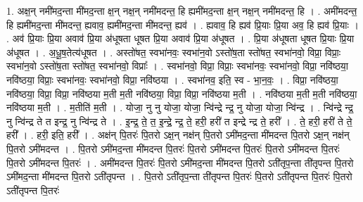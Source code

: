 \documentclass[17pt]{extarticle}
\begin{document}
1. अक्ष॒न् नमी॑मद॒न्ता मी॑मद॒न्ता क्ष॒न् नक्ष॒न् नमी॑मदन्त॒ हि ह्यमी॑मद॒न्ता क्ष॒न् नक्ष॒न् नमी॑मदन्त॒ हि । . अमी॑मदन्त॒ हि ह्यमी॑मद॒न्ता मी॑मदन्त॒ ह्यवाव॒ ह्यमी॑मद॒न्ता मी॑मदन्त॒ ह्यव॑ । . ह्यवाव॒ हि ह्यव॑ प्रि॒याः प्रि॒या अव॒ हि ह्यव॑ प्रि॒याः । . अव॑ प्रि॒याः प्रि॒या अवाव॑ प्रि॒या अ॑धूषता धूषत प्रि॒या अवाव॑ प्रि॒या अ॑धूषत । . प्रि॒या अ॑धूषता धूषत प्रि॒याः प्रि॒या अ॑धूषत । . अ॒धू॒ष॒तेत्य॑धूषत । . अस्तो॑षत॒ स्वभा॑नवः॒ स्वभा॑न॒वो ऽस्तो॑ष॒ता स्तो॑षत॒ स्वभा॑नवो॒ विप्रा॒ विप्राः॒ स्वभा॑न॒वो ऽस्तो॑ष॒ता स्तो॑षत॒ स्वभा॑नवो॒ विप्राः᳚ । . स्वभा॑नवो॒ विप्रा॒ विप्राः॒ स्वभा॑नवः॒ स्वभा॑नवो॒ विप्रा॒ नवि॑ष्ठया॒ नवि॑ष्ठया॒ विप्राः॒ स्वभा॑नवः॒ स्वभा॑नवो॒ विप्रा॒ नवि॑ष्ठया । . स्वभा॑नव॒ इति॒ स्व - भा॒न॒वः॒ । . विप्रा॒ नवि॑ष्ठया॒ नवि॑ष्ठया॒ विप्रा॒ विप्रा॒ नवि॑ष्ठया म॒ती म॒ती नवि॑ष्ठया॒ विप्रा॒ विप्रा॒ नवि॑ष्ठया म॒ती । . नवि॑ष्ठया म॒ती म॒ती नवि॑ष्ठया॒ नवि॑ष्ठया म॒ती । . म॒तीति॑ म॒ती । . योजा॒ नु नु योजा॒ योजा॒ न्वि॑न्द्रे न्द्र॒ नु योजा॒ योजा॒ न्वि॑न्द्र । . न्वि॑न्द्रे न्द्र॒ नु न्वि॑न्द्र ते त इन्द्र॒ नु न्वि॑न्द्र ते । . इ॒न्द्र॒ ते॒ त॒ इ॒न्द्रे॒ न्द्र॒ ते॒ हरी॒ हरी॑ त इन्द्रे न्द्र ते॒ हरी᳚ । . ते॒ हरी॒ हरी॑ ते ते॒ हरी᳚ । . हरी॒ इति॒ हरी᳚ । . अक्ष॑न् पि॒तरः॑ पि॒तरो ऽक्ष॒न् नक्ष॑न् पि॒तरो ऽमी॑मद॒न्ता मी॑मदन्त पि॒तरो ऽक्ष॒न् नक्ष॑न् पि॒तरो ऽमी॑मदन्त । . पि॒तरो ऽमी॑मद॒न्ता मी॑मदन्त पि॒तरः॑ पि॒तरो ऽमी॑मदन्त पि॒तरः॑ पि॒तरो ऽमी॑मदन्त पि॒तरः॑ पि॒तरो ऽमी॑मदन्त पि॒तरः॑ । . अमी॑मदन्त पि॒तरः॑ पि॒तरो ऽमी॑मद॒न्ता मी॑मदन्त पि॒तरो ऽती॑तृप॒न्ता ती॑तृपन्त पि॒तरो ऽमी॑मद॒न्ता मी॑मदन्त पि॒तरो ऽती॑तृपन्त । . पि॒तरो ऽती॑तृप॒न्ता ती॑तृपन्त पि॒तरः॑ पि॒तरो ऽती॑तृपन्त पि॒तरः॑ पि॒तरो ऽती॑तृपन्त पि॒तरः॑ 
\end{document}

